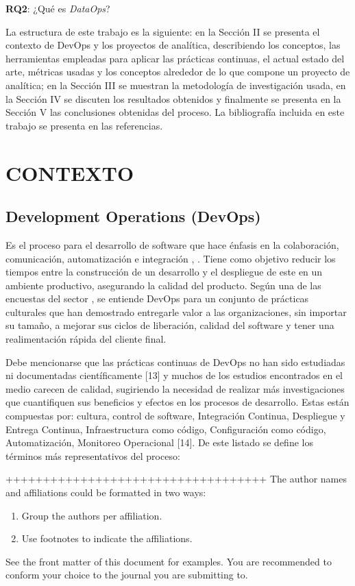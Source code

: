 \documentclass[review]{elsarticle}
\begin{document}
\textbf{RQ2}: ¿Qué es \textit{DataOps}?

La estructura de este trabajo es la siguiente: en la Sección II se presenta el contexto de DevOps y los proyectos de analítica, describiendo los conceptos, las herramientas empleadas para aplicar las prácticas continuas, el actual estado del arte, métricas usadas y los conceptos alrededor de lo que compone un proyecto de analítica; en la Sección III se muestran la metodología de investigación usada, en la Sección IV se discuten los resultados obtenidos y finalmente se presenta en la Sección V las conclusiones obtenidas del proceso. La bibliografía incluida en este trabajo se presenta en las referencias.

\section{CONTEXTO}
\subsection{Development Operations (DevOps)}

Es el proceso para el desarrollo de software que hace énfasis en la colaboración, comunicación, automatización e integración \cite{Huttermann2012}, \cite{Rangel2015}. Tiene como objetivo reducir los tiempos entre la construcción de un desarrollo y el despliegue de este en un ambiente productivo, asegurando la calidad del producto. Según una de las encuestas del sector \cite{Puppet2017}, se entiende DevOps para un conjunto de prácticas culturales que han demostrado entregarle valor a las organizaciones, sin importar su tamaño, a mejorar sus ciclos de liberación, calidad del software y tener una realimentación rápida del cliente final. 

Debe mencionarse que las prácticas continuas de DevOps no han sido estudiadas ni documentadas científicamente [13] y muchos de los estudios encontrados en el medio carecen de calidad, sugiriendo la necesidad de realizar más investigaciones que cuantifiquen sus beneficios y efectos en los procesos de desarrollo. Estas están compuestas por: cultura, control de software, Integración Continua, Despliegue y Entrega Continua, Infraestructura como código, Configuración como código, Automatización, Monitoreo Operacional [14]. De este listado se define los términos más representativos del proceso:


+++++++++++++++++++++++++++++++++++
The author names and affiliations could be formatted in two ways:
\begin{enumerate}[(1)]
\item Group the authors per affiliation.
\item Use footnotes to indicate the affiliations.
\end{enumerate}
See the front matter of this document for examples. You are recommended to conform your choice to the journal you are submitting to.
\end{document}
